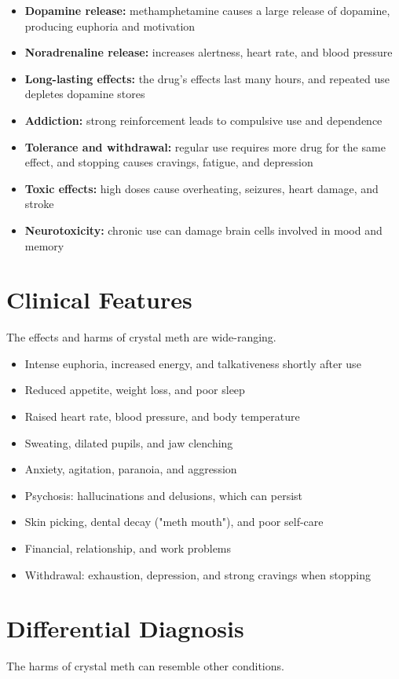 \begin{itemize}
    \item \textbf{Dopamine release:} methamphetamine causes a large release of dopamine, producing euphoria and motivation
    \item \textbf{Noradrenaline release:} increases alertness, heart rate, and blood pressure
    \item \textbf{Long-lasting effects:} the drug's effects last many hours, and repeated use depletes dopamine stores
    \item \textbf{Addiction:} strong reinforcement leads to compulsive use and dependence
    \item \textbf{Tolerance and withdrawal:} regular use requires more drug for the same effect, and stopping causes cravings, fatigue, and depression
    \item \textbf{Toxic effects:} high doses cause overheating, seizures, heart damage, and stroke
    \item \textbf{Neurotoxicity:} chronic use can damage brain cells involved in mood and memory
\end{itemize}

\section*{Clinical Features}
The effects and harms of crystal meth are wide-ranging.

\begin{itemize}
    \item Intense euphoria, increased energy, and talkativeness shortly after use
    \item Reduced appetite, weight loss, and poor sleep
    \item Raised heart rate, blood pressure, and body temperature
    \item Sweating, dilated pupils, and jaw clenching
    \item Anxiety, agitation, paranoia, and aggression
    \item Psychosis: hallucinations and delusions, which can persist
    \item Skin picking, dental decay ("meth mouth"), and poor self-care
    \item Financial, relationship, and work problems
    \item Withdrawal: exhaustion, depression, and strong cravings when stopping
\end{itemize}

\section*{Differential Diagnosis}
The harms of crystal meth can resemble other conditions.

